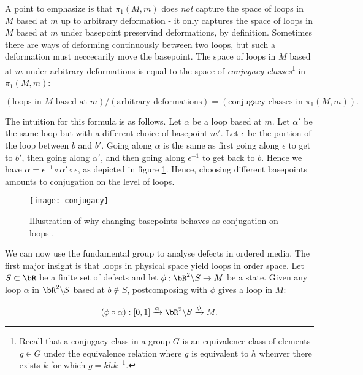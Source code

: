 \begin{rem}
A point to emphasize is that $\pi_1(M,m)$ does \textit{not} capture the space of loops in $M$ based at $m$ up to arbitrary deformation - it only captures the space of loops in $M$ based at $m$ under basepoint preservind deformations, by definition. Sometimes there are ways of deforming continuously between two loops, but such a deformation must neccecarily move the basepoint. The space of loops in $M$ based at $m$ under arbitrary deformations is equal to the space of \textit{conjugacy classes}\footnote{Recall that a conjugacy class in a group $G$ is an equivalence class of elements $g\in G$ under the equivalence relation where $g$ is equivalent to $h$ whenver there exists $k$ for which $g=k h k^{-1}$.} in $\pi_1(M,m)$:

$$\left(\text{loops in $M$ based at $m$}\right)/\left(\text{arbitrary deformations}\right)= \left(\text{conjugacy classes in }\pi_1(M,m)\right).$$

The intuition for this formula is as follows. Let $\alpha$ be a loop based at $m$. Let $\alpha'$ be the same loop but with a different choice of basepoint $m'$. Let $\epsilon$ be the portion of the loop between $b$ and $b'$. Going along $\alpha$ is the same as first going along $\epsilon$ to get to $b'$, then going along $\alpha'$, and then going along $\epsilon^{-1}$ to get back to $b$. Hence we have $\alpha = \epsilon^{-1}\circ \alpha' \circ \epsilon$, as depicted in figure \ref{conjugacy}. Hence, choosing different basepoints amounts to conjugation on the level of loops.

\begin{figure}
\begin{center}
\texttt{[image: conjugacy]}
\caption{Illustration of why changing basepoints behaves as conjugation on loops .}
\label{conjugacy}
\end{center}
\end{figure}
\end{rem}

We can now use the fundamental group to analyse defects in ordered media. The first major insight is that loops in physical space yield loops in order space. Let $S\subset \bR$ be a finite set of defects and let $\phi: \bR^2 \backslash S \to M$ be a state. Given any loop $\alpha$ in $\bR^2\backslash S$ based at $b\not\in S$, postcomposing with $\phi$ gives a loop in $M$:

$$(\phi \circ \alpha): [0,1]\xrightarrow{\alpha} \bR^2 \backslash S \xrightarrow{\phi} M.$$

